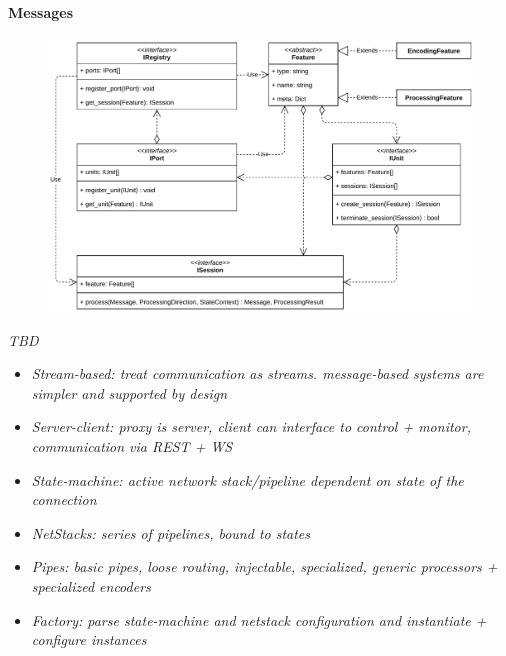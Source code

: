\paragraph{Messages}
\begin{figure}[h]
    \centering
    \includegraphics[width=14cm]{img/ch05/component-view2-3-registry-port-unit.pdf}
    \label{fig:component-view2-3-registry-port-unit}
\end{figure}


\emph{TBD} %
\begin{itemize}
    \item \emph{Stream-based: treat communication as streams. message-based systems are simpler and supported by design}
    \item \emph{Server-client: proxy is server, client can interface to control + monitor, communication via REST + WS}
    \item \emph{State-machine: active network stack/pipeline dependent on state of the connection}
    \item \emph{NetStacks: series of pipelines, bound to states}
    \item \emph{Pipes: basic pipes, loose routing, injectable, specialized, generic processors + specialized encoders}
    \item \emph{Factory: parse state-machine and netstack configuration and instantiate + configure instances}
\end{itemize}